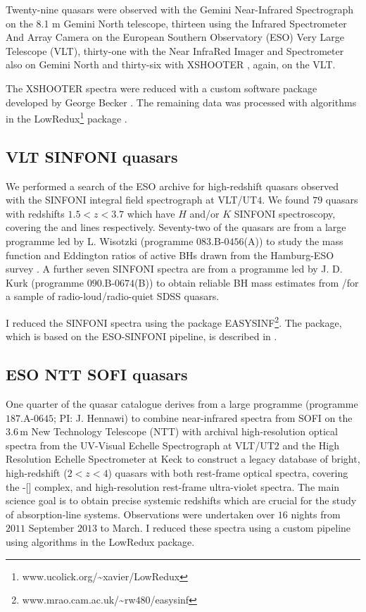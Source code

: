 Twenty-nine quasars were observed with the Gemini Near-Infrared Spectrograph \citep[GNIRS;][]{elias06} on the 8.1 m Gemini North telescope, thirteen using the Infrared Spectrometer And Array Camera \citep[ISAAC;][]{moorwood98b} on the European Southern Observatory (ESO) Very Large Telescope (VLT), thirty-one with the Near InfraRed Imager and Spectrometer \citep[NIRI;][]{hodapp03} also on Gemini North and thirty-six with XSHOOTER \citep{vernet11}, again, on the VLT. 

The  XSHOOTER  spectra  were  reduced  with  a  custom  software  package  developed  by  George  Becker \citep[for details, see][]{lau16}. 
The remaining data was processed with algorithms in the LowRedux\footnote{www.ucolick.org/\textasciitilde xavier/LowRedux} package \citep[see][]{prochaska09}.

\subsection{VLT SINFONI quasars}

We performed a search of the ESO archive for high-redshift quasars observed with the SINFONI  integral  field  spectrograph \citep{eisenhauer03,bonnet04} at VLT/UT$4$.
We found $79$ quasars with redshifts $1.5 < z < 3.7$ which have $H$ and/or $K$ SINFONI spectroscopy, covering the \hb and \ha lines respectively. 
Seventy-two of the quasars are from a large programme led by L. Wisotzki (programme $083$.B-$0456$(A)) to study the mass function and Eddington ratios of active BHs drawn from the Hamburg-ESO survey \citep{wisotzki00}.
A further seven SINFONI spectra are from a programme led by  J. D. Kurk (programme $090$.B-$0674$(B)) to obtain reliable BH mass estimates from \hans/\hb for a sample of radio-loud/radio-quiet SDSS quasars.

I reduced the SINFONI spectra using the package EASYSINF\footnote{www.mrao.cam.ac.uk/\textasciitilde rw$480$/easysinf}.  
The package, which is based on the ESO-SINFONI pipeline, is described in \citet{williams16}. 

\subsection{ESO NTT SOFI quasars}

One quarter of the quasar catalogue derives from a large programme (programme $187$.A-$0645$; PI: J. Hennawi) to combine near-infrared spectra from SOFI \citep{moorwood98a} on the $3.6$\,m New Technology Telescope (NTT) with archival high-resolution optical spectra from the UV-Visual Echelle Spectrograph \citep[UVES;][]{dekker00} at VLT/UT$2$ and the High Resolution Echelle Spectrometer \citep[HIRES;][]{vogt94} at Keck to construct a legacy database of bright, high-redshift ($2 < z < 4$) quasars with both rest-frame optical spectra, covering the \hbns-[] complex, and high-resolution rest-frame ultra-violet spectra.
The main science goal is to obtain precise systemic redshifts which are crucial for the study of absorption-line systems.  
Observations were undertaken over $16$ nights from $2011$ September $2013$ to March.
I reduced these spectra using a custom pipeline using algorithms in the LowRedux package.

